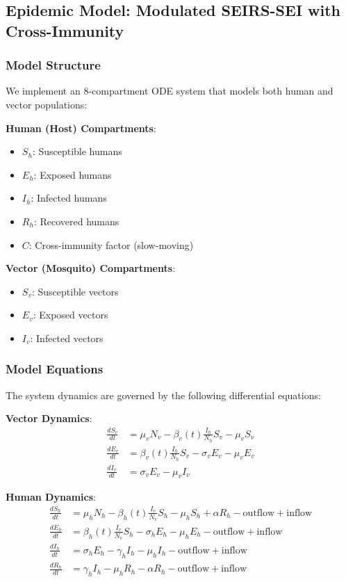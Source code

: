 \documentclass[12pt,a4paper]{article}
\begin{document}
\subsection{Epidemic Model: Modulated SEIRS-SEI with Cross-Immunity}

\subsubsection{Model Structure}
We implement an 8-compartment ODE system that models both human and vector populations:

\textbf{Human (Host) Compartments}:
\begin{itemize}
    \item $S_h$: Susceptible humans
    \item $E_h$: Exposed humans
    \item $I_h$: Infected humans
    \item $R_h$: Recovered humans
    \item $C$: Cross-immunity factor (slow-moving)
\end{itemize}

\textbf{Vector (Mosquito) Compartments}:
\begin{itemize}
    \item $S_v$: Susceptible vectors
    \item $E_v$: Exposed vectors
    \item $I_v$: Infected vectors
\end{itemize}

\subsubsection{Model Equations}

The system dynamics are governed by the following differential equations:

\textbf{Vector Dynamics}:
\begin{align}
\frac{dS_v}{dt} &= \mu_v N_v - \beta_v(t) \frac{I_h}{N_h} S_v - \mu_v S_v \\
\frac{dE_v}{dt} &= \beta_v(t) \frac{I_h}{N_h} S_v - \sigma_v E_v - \mu_v E_v \\
\frac{dI_v}{dt} &= \sigma_v E_v - \mu_v I_v
\end{align}

\textbf{Human Dynamics}:
\begin{align}
\frac{dS_h}{dt} &= \mu_h N_h - \beta_h(t) \frac{I_v}{N_v} S_h - \mu_h S_h + \alpha R_h - \text{outflow} + \text{inflow} \\
\frac{dE_h}{dt} &= \beta_h(t) \frac{I_v}{N_v} S_h - \sigma_h E_h - \mu_h E_h - \text{outflow} + \text{inflow} \\
\frac{dI_h}{dt} &= \sigma_h E_h - \gamma_h I_h - \mu_h I_h - \text{outflow} + \text{inflow} \\
\frac{dR_h}{dt} &= \gamma_h I_h - \mu_h R_h - \alpha R_h - \text{outflow} + \text{inflow}
\end{align}
\end{document}
